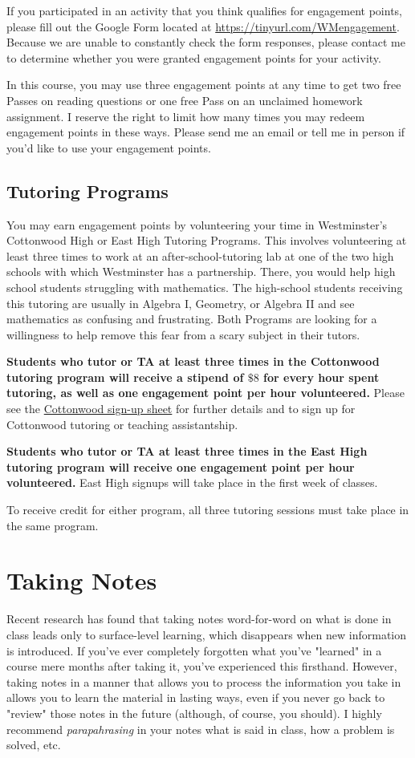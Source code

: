 \documentclass[11pt, a4paper]{article}
\begin{document}
If you participated in an activity that you think qualifies for engagement points, please fill out the Google Form located at \url{https://tinyurl.com/WMengagement}. Because we are unable to constantly check the form responses, please contact me to determine whether you were granted engagement points for your activity.

In this course, you may use three engagement points at any time to get two free Passes on reading questions or one free Pass on an unclaimed homework assignment. I reserve the right to limit how many times you may redeem engagement points in these ways. Please send me an email or tell me in person if you'd like to use your engagement points.

\subsection*{Tutoring Programs}

You may earn engagement points by volunteering your time in Westminster's Cottonwood High or East High Tutoring Programs. This involves volunteering at least three times to work at an after-school-tutoring lab at one of the two high schools with which Westminster has a partnership. There, you would help high school students struggling with mathematics. The high-school students receiving this tutoring are usually in Algebra I, Geometry, or Algebra II and see mathematics as confusing and frustrating. Both Programs are looking for a willingness to help remove this fear from a scary subject in their tutors.

\textbf{Students who tutor or TA at least three times in the Cottonwood tutoring program will receive a stipend of $\$8$ for every hour spent tutoring, as well as one engagement point per hour volunteered.} Please see the \href{https://tinyurl.com/sherlockclub}{Cottonwood sign-up sheet} for further details and to sign up for Cottonwood tutoring or teaching assistantship. 

\textbf{Students who tutor or TA at least three times in the East High tutoring program will receive one engagement point per hour volunteered.} East High signups will take place in the first week of classes.

To receive credit for either program, all three tutoring sessions must take place in the same program.

\section*{Taking Notes} Recent research has found that taking notes word-for-word on what is done in class leads only to surface-level learning, which disappears when new information is introduced. If you've ever completely forgotten what you've "learned" in a course mere months after taking it, you've experienced this firsthand. However, taking notes in a manner that allows you to process the information you take in allows you to learn the material in lasting ways, even if you never go back to "review" those notes in the future (although, of course, you should). I highly recommend \emph{parapahrasing} in your notes what is said in class, how a problem is solved, etc.
\end{document}
